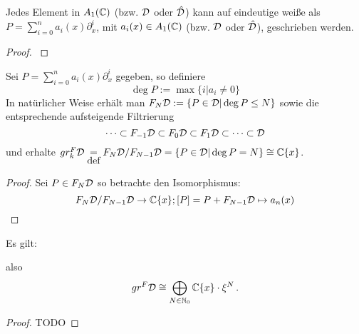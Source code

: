 \begin{prop} \label{prop:weyl_eindeutige_schreibung}
Jedes Element in $A_1(\mathbb{C})$ (bzw. $\mathcal{D}$ oder $\hat{\mathcal{D}}$) kann auf eindeutige
weiße als $P=\sum_{i=0}^na_i(x)\partial_x^i$, mit $a_i(x)\in A_1(\mathbb{C})$ (bzw.
$\mathcal{D}$ oder $\hat{\mathcal{D}}$), geschrieben werden. 
\end{prop}
\begin{proof}
\cite[Proposition 1.2.3]{sabbah_cimpa90}
\begin{comment}
ein teil des Beweises ist "left as an exersice"
\end{comment}
\end{proof}



\begin{defn}
Sei $P=\sum_{i=0}^na_i(x)\partial_x^i$ gegeben, so definiere 
\[
\deg P:=\max\{i|a_i\neq 0\}
\]
In natürlicher Weise erhält man $F_N\mathcal{D}:=\{P\in\mathcal{D}|\deg P\leq N\}$ sowie die
entsprechende aufsteigende Filtrierung
\[
\cdots\subset F_{-1}\mathcal{D}\subset F_{0}\mathcal{D}\subset
F_{1}\mathcal{D}\subset\cdots\subset\mathcal{D}
\]
und erhalte $gr_k^F\mathcal{D}\underset{\mbox{def}}{=}F_N\mathcal{D}\slash F_{N-1}\mathcal{D}
=\{P\in\mathcal{D}|\deg P=N\}\cong\mathbb{C}\{x\}$.
\end{defn}

\begin{proof}
Sei $P\in F_N\mathcal{D}$ so betrachte den Isomorphismus:
\[
F_N\mathcal{D}\slash F_{N-1}\mathcal{D}\rightarrow \mathbb{C}\{x\}; [P]=P+F_{N-1}\mathcal{D}\mapsto a_n(x)
\]
\end{proof}

\begin{prop}
Es gilt:
\begin{center}
\end{center}
also
\[ gr^F\mathcal{D} \cong \bigoplus_{N\in\mathbb{N}_0}\mathbb{C}\{x\}\cdot \xi^N \,. \]
\end{prop}
\begin{proof} TODO
\begin{comment}
Treffen?
\end{comment}
\end{proof}

